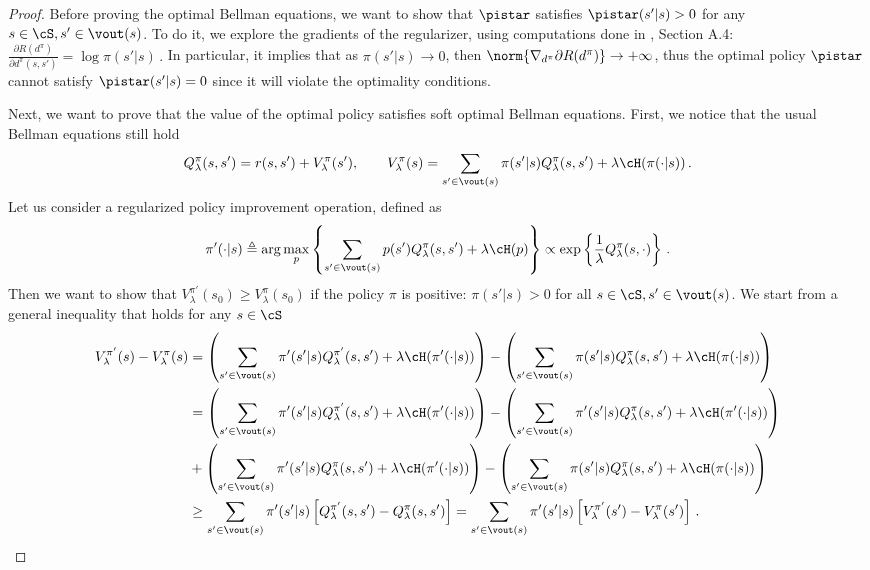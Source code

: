 \begin{proof}
    Before proving the optimal Bellman equations, we want to show that $\pistar$ satisfies $\pistar(s'|s) > 0$ for any $s \in \cS, s' \in \vout(s)$. To do it, we explore the gradients of the regularizer, using computations done in \cite{neu2017unified}, Section A.4:
    $
        \frac{\partial R(d^\pi)}{\partial d^\pi(s,s')} = \log \pi(s'|s)\,.
    $
    In particular, it implies that as $\pi(s'|s) \to 0$, then $\norm{\nabla_{d^{\pi}} \partial R(d^\pi)} \to +\infty$, thus the optimal policy $\pistar$ cannot satisfy $\pistar(s'|s) = 0$ since it will violate the optimality conditions.


    Next, we want to prove that the value of the optimal policy satisfies soft optimal Bellman equations. First, we notice that the usual Bellman equations still hold
    \[
        Q^{\pi}_{\lambda}(s,s') = r(s,s') + V^{\pi}_{\lambda}(s'), \qquad V^{\pi}_{\lambda}(s) = \sum_{s' \in \vout(s)} \pi(s'|s) Q^{\pi}_\lambda(s,s') + \lambda \cH(\pi(\cdot | s))\,.
    \]
    Let us consider a regularized policy improvement operation, defined as
    \[
        \pi'(\cdot|s) \triangleq \arg\max_{p}  \left\{ \sum_{s' \in \vout(s)} p(s') Q^{\pi}_\lambda(s,s') + \lambda \cH(p) \right\} \propto \exp\left\{ \frac{1}{\lambda} Q^{\pi}_{\lambda}(s, \cdot) \right\} \,.
    \]
    Then we want to show that $V^{\pi'}_{\lambda}(s_0) \geq V^{\pi}_{\lambda}(s_0)$ if the policy $\pi$ is positive: $\pi(s'|s) > 0$ for all $s \in \cS, s'\in \vout(s)$. 
    We start from a general inequality that holds for any $s \in \cS$
    \begin{align*}
        V^{\pi'}_{\lambda}(s) - V^{\pi}_{\lambda}(s) &= \left(\sum_{s' \in \vout(s)} \pi'(s'|s) Q^{\pi'}_\lambda(s,s') + \lambda \cH(\pi'(\cdot | s))\right)
        -  \left( \sum_{s' \in \vout(s)} \pi(s'|s) Q^{\pi}_\lambda(s,s') + \lambda \cH(\pi(\cdot | s))\right) \\
        &= \left(\sum_{s' \in \vout(s)} \pi'(s'|s) Q^{\pi'}_\lambda(s,s') + \lambda \cH(\pi'(\cdot | s))\right) - \left(\sum_{s' \in \vout(s)} \pi'(s'|s) Q^{\pi}_\lambda(s,s') + \lambda \cH(\pi'(\cdot | s))\right) \\
        &+ \left(\sum_{s' \in \vout(s)} \pi'(s'|s) Q^{\pi}_\lambda(s,s') + \lambda \cH(\pi'(\cdot | s))\right) 
         -\left(\sum_{s' \in \vout(s)} \pi(s'|s) Q^{\pi}_\lambda(s,s') + \lambda \cH(\pi(\cdot | s))\right) \\
         &\geq \sum_{s' \in \vout(s)} \pi'(s'|s) \left[ Q^{\pi'}_{\lambda}(s,s') - Q^{\pi}_{\lambda}(s,s') \right] = \sum_{s' \in \vout(s)} \pi'(s'|s) \left[ V^{\pi'}_{\lambda}(s') - V^{\pi}_{\lambda}(s') \right]\,.

\end{align*}
\end{proof}
